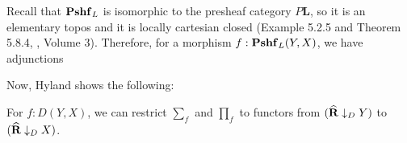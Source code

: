 Recall that $ \mathbf{Pshf}_{L} $ is isomorphic to the presheaf category $ P \mathbf L $, so it is an elementary topos and it is locally cartesian closed (Example 5.2.5 and Theorem 5.8.4, \autocite{borceux}, Volume 3). Therefore, for a morphism $ f: \mathbf{Pshf}_{L}(Y, X) $, we have adjunctions
\begin{center}
\end{center}

Now, Hyland shows the following:
\begin{theorem}\label{thm:restrict-sum-product}
  For $ f : D(Y, X) $, we can restrict $ \sum_f $ and $ \prod_f $ to functors from $ (\widehat {\mathbf{R}} \downarrow_D Y) $ to $ (\widehat {\mathbf{R}} \downarrow_D X) $.
\end{theorem}
